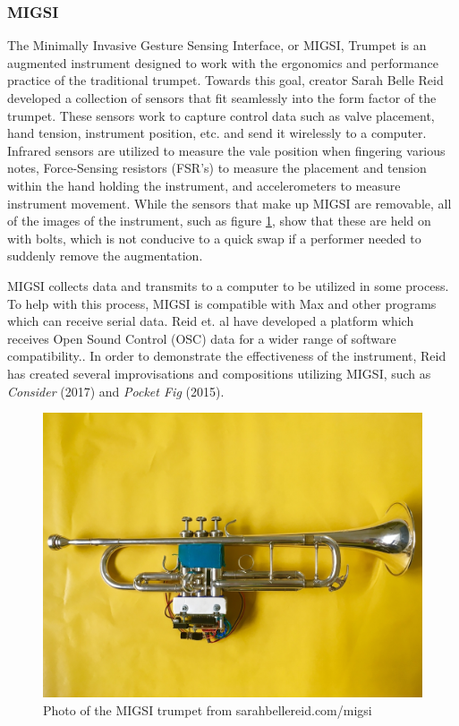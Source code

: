 \subsubsection{MIGSI}

The Minimally Invasive Gesture Sensing Interface, or MIGSI, Trumpet is an augmented instrument designed to work with the ergonomics and performance practice of the traditional trumpet\cite{reid2016}. Towards this goal, creator Sarah Belle Reid developed a collection of sensors that fit seamlessly into the form factor of the trumpet. These sensors work to capture control data such as valve placement, hand tension, instrument position, etc. and send it wirelessly to a computer. Infrared sensors are utilized to measure the vale position when fingering various notes, Force-Sensing resistors (FSR's) to measure the placement and tension within the hand holding the instrument, and accelerometers to measure instrument movement. While the sensors that make up MIGSI are removable, all of the images of the instrument, such as figure \ref{fig:MIGSI}, show that these are held on with bolts, which is not conducive to a quick swap if a performer needed to suddenly remove the augmentation.

MIGSI collects data and transmits to a computer to be utilized in some process. To help with this process, MIGSI is compatible with Max and other programs which can receive serial data\cite{reid2016}. Reid et. al have developed a platform which receives Open Sound Control (OSC) data for a wider range of software compatibility.\cite{reid_2019}. In order to demonstrate the effectiveness of the instrument, Reid has created several improvisations and compositions utilizing MIGSI, such as \textit{Consider} (2017) and \textit{Pocket Fig} (2015).

\begin{figure}
    \centering
    \includegraphics[scale=0.25]{diagrams/MIGSI.jpg}
    \caption{Photo of the MIGSI trumpet from sarahbellereid.com/migsi}
    \label{fig:MIGSI} %
\end{figure}



